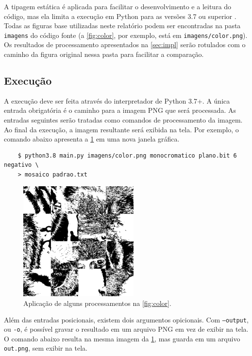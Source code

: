 A tipagem estática é aplicada para facilitar o desenvolvimento e a leitura do código, mas ela limita a execução em Python para as versões 3.7 ou superior \autocite{ref:pep563}. Todas as figuras base utilizadas neste relatório podem ser encontradas na pasta \texttt{imagens} do código fonte (a \cref{fig:color}, por exemplo, está em \texttt{imagens/color.png}). Os resultados de processamento apresentados na \cref{sec:impl} serão rotulados com o caminho da figura original nessa pasta para facilitar a comparação.

\subsection{Execução}

A execução deve ser feita através do interpretador de Python 3.7+. A única entrada obrigatória é o caminho para a imagem PNG que será processada. As entradas seguintes serão tratadas como comandos de processamento da imagem. Ao final da execução, a imagem resultante será exibida na tela. Por exemplo, o comando abaixo apresenta a \cref{fig:execucao} em uma nova janela gráfica.

\begin{verbatim}
    $ python3.8 main.py imagens/color.png monocromatico plano.bit 6 negativo \
    > mosaico padrao.txt
\end{verbatim}

\begin{figure}[H]
    \centering
    \includegraphics[width=6cm]{resultados/execucao.png}

    \caption{Aplicação de alguns processamentos na \cref{fig:color}.}
    \label{fig:execucao}
\end{figure}

Além das entradas posicionais, existem dois argumentos opicionais. Com \texttt{--output}, ou \texttt{-o}, é possível gravar o resultado em um arquivo PNG em vez de exibir na tela. O comando abaixo resulta na mesma imagem da \cref{fig:execucao}, mas guarda em um arquivo \texttt{out.png}, sem exibir na tela.

